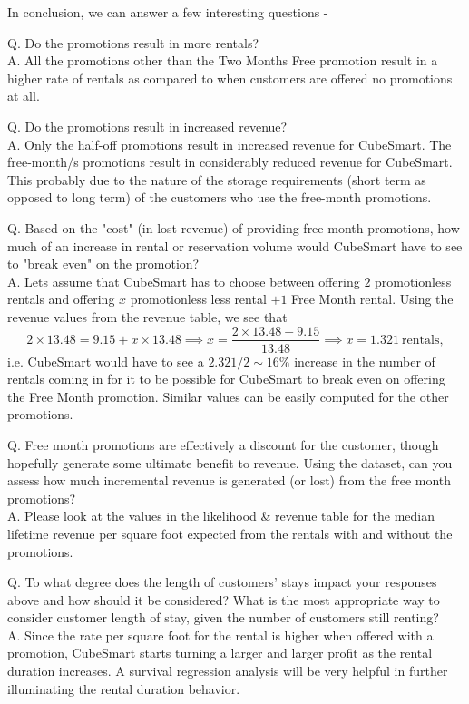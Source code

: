 \documentclass[times]{aastex6}
\begin{document}
In conclusion, we can answer a few interesting questions -

Q. Do the promotions result in more rentals?\\
A. All the promotions other than the Two Months Free promotion result in a higher rate of rentals as compared to when customers are offered no promotions at all.

Q. Do the promotions result in increased revenue?\\
A. Only the half-off promotions result in increased revenue for CubeSmart. The free-month/s promotions result in considerably reduced revenue for CubeSmart. This probably due to the nature of the storage requirements (short term as opposed to long term) of the customers who use the free-month promotions.

Q. Based on the "cost" (in lost revenue) of providing free month promotions, how much of an increase in rental or reservation volume would CubeSmart have to see to "break even" on the promotion?\\
A. Lets assume that CubeSmart has to choose between offering $2$ promotionless rentals and offering $x$ promotionless less rental $+ 1$ Free Month rental. Using the revenue values from the revenue table, we see that
\begin{equation*}
    2 \times 13.48 = 9.15 + x \times 13.48 \implies x = \frac{2 \times 13.48 - 9.15}{13.48} \implies x = 1.321\ \mathrm{rentals},
\end{equation*}
i.e. CubeSmart would have to see a $2.321/2 \sim 16\%$ increase in the number of rentals coming in for it to be possible for CubeSmart to break even on offering the Free Month promotion. Similar values can be easily computed for the other promotions.

Q. Free month promotions are effectively a discount for the customer, though hopefully generate some ultimate benefit to revenue.  Using the dataset, can you assess how much incremental revenue is generated (or lost) from the free month promotions?\\
A. Please look at the values in the likelihood \& revenue table for the median lifetime revenue per square foot expected from the rentals with and without the promotions.

Q. To what degree does the length of customers' stays impact your responses above and how should it be considered?  What is the most appropriate way to consider customer length of stay, given the number of customers still renting?\\
A. Since the rate per square foot for the rental is higher when offered with a promotion, CubeSmart starts turning a larger and larger profit as the rental duration increases. A survival regression analysis will be very helpful in further illuminating the rental duration behavior.
\end{document}
